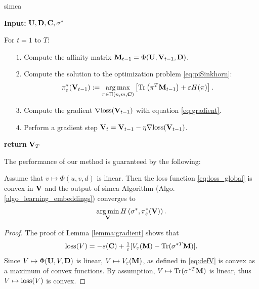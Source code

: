 \begin{algorithm}[h]
\caption{\label{algo_learning_embeddings} \ac{simca}}
\begin{flushleft}
    \textbf{Input:} $\mathbf{U}, \mathbf{D}, \mathbf{C}, \sigma^*$

    For $t =1$ to $T$:

    \begin{itemize}
    	\item[$1.$] Compute the affinity matrix $\mathbf{M}_{t-1} = \Phi(\mathbf{U},\mathbf{V}_{t-1},\mathbf{D})$.

    	\item[$2.$]  Compute the solution to the optimization problem \eqref{eq:piSinkhorn}:
    	\begin{equation*}
    	\pi_{\varepsilon}^*(\mathbf{V}_{t-1}) := \operatorname*{arg\,max}_{\pi \in \Pi(n,m,\mathbf{C})} \left[{\rm Tr}\left( \pi^T \mathbf{M}_{t-1} \right) + \varepsilon H(\pi) \right].
    	\end{equation*}

    	\item[$3.$]  Compute the gradient $\nabla \mathrm{loss}(\mathbf{V}_{t-1})$ with equation \eqref{eq:gradient}.

    	\item[$4.$]  Perform a gradient step $\mathbf{V}_{t} = \mathbf{V}_{t-1} - \eta \nabla \mathrm{loss}(\mathbf{V}_{t-1})$.
    \end{itemize}
\textbf{return} $\mathbf{V}_T$
\end{flushleft}
\end{algorithm}

The performance of our method is guaranteed by the following:
\begin{lemma}\label{lemma:convergence_guarantee}
Assume that $v \mapsto \Phi(u,v,d)$ is linear. Then the loss function \eqref{eq:loss_global} is convex in $\mathbf{V}$ and the output of \ac{simca} Algorithm (Algo. \ref{algo_learning_embeddings}) converges to
\begin{equation*}
    \operatorname*{arg\,min}_{\mathbf{V}} H\left(\sigma^*,\pi^*_{\varepsilon}(\mathbf{V})\right).
\end{equation*}
\end{lemma}

\begin{proof}
The proof of Lemma \ref{lemma:gradient} shows that
\begin{equation*}
    \mathrm{loss}(V) = -s(\mathbf{C}) + \tfrac{1}{\varepsilon} [
          V_\varepsilon(\mathbf{M}) - {\rm Tr}(\sigma^{*T}\mathbf{M})].
\end{equation*}
Since $V \mapsto \Phi(\mathbf{U},V,\mathbf{D})$ is linear, $V \mapsto V_\varepsilon(\mathbf{M})$, as defined in \eqref{eq:defV} is convex as a maximum of convex functions. By assumption, $V \mapsto {\rm Tr}(\sigma^{*T}\mathbf{M})$ is linear, thus $V \mapsto \mathrm{loss}(V)$ is convex.
\end{proof}

